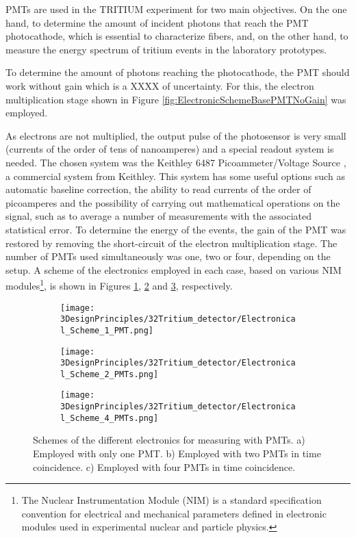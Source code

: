 PMTs are used in the TRITIUM experiment for two main objectives. On the one hand, to determine the amount of incident photons that reach the PMT photocathode, which is essential to characterize fibers, and, on the other hand, to measure the energy spectrum of tritium events in the laboratory prototypes.

To determine the amount of photons reaching the photocathode, the PMT should work without gain which is a XXXX of uncertainty. For this, the electron multiplication stage shown in Figure \ref{fig:ElectronicSchemeBasePMTNoGain} was employed. 

As electrons are not multiplied, the output pulse of the photosensor is very small (currents of the order of tens of nanoamperes) and a special readout system is needed. The chosen system was the Keithley 6487 Picoammeter/Voltage Source \cite{DataSheetKeithley6487}, a commercial system from Keithley. This system has some useful options such as automatic baseline correction, the ability to read currents of the order of picoamperes and the possibility of carrying out mathematical operations on the signal, such as to average a number of measurements with the associated statistical error. To determine the energy of the events, the gain of the PMT was restored by removing the short-circuit of the electron multiplication stage. The number of PMTs used simultaneously was one, two or four, depending on the setup. A scheme of the electronics employed in each case, based on various NIM modules\footnote{The Nuclear Instrumentation Module (NIM) is a standard specification convention for electrical and mechanical parameters defined in electronic modules used in experimental nuclear and particle physics.}, is shown in Figures \ref{subfig:ElectronicConfiguraiton1PMT}, \ref{subfig:ElectronicConfiguraiton2PMT} and \ref{subfig:ElectronicConfiguraiton4PMT}, respectively.

\begin{figure}
\centering
    \begin{subfigure}[b]{1.0\textwidth}
    \centering
    \texttt{[image: 3DesignPrinciples/32Tritium\_detector/Electronical\_Scheme\_1\_PMT.png]}  
    \caption{\label{subfig:ElectronicConfiguraiton1PMT}}
    \end{subfigure}
    \hfill
    \begin{subfigure}[b]{1.0\textwidth}
    \centering
    \texttt{[image: 3DesignPrinciples/32Tritium\_detector/Electronical\_Scheme\_2\_PMTs.png]}  
    \caption{\label{subfig:ElectronicConfiguraiton2PMT}}
    \end{subfigure}
    \hfill
    \begin{subfigure}[b]{1.0\textwidth}
    \centering
    \texttt{[image: 3DesignPrinciples/32Tritium\_detector/Electronical\_Scheme\_4\_PMTs.png]}  
    \caption{\label{subfig:ElectronicConfiguraiton4PMT}}
    \end{subfigure}
 \caption{Schemes of the different electronics for measuring with PMTs. a) Employed with only one PMT. b) Employed with two PMTs in time coincidence. c) Employed with four PMTs in time coincidence.}
 \label{fig:ElectronicConfiguraitonsPMT}
\end{figure}

